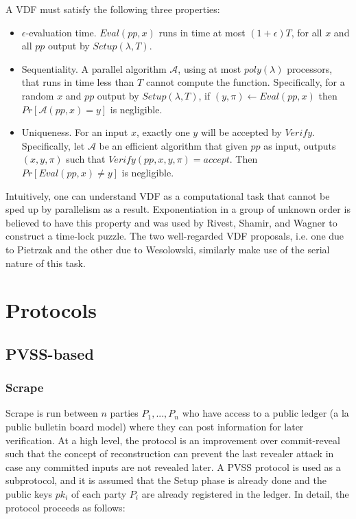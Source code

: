 \documentclass[11pt]{article}
\theoremstyle{definition}
\theoremstyle{remark}
\begin{document}
A VDF must satisfy the following three properties:
\begin{itemize}
\item $\epsilon$-evaluation time. $Eval(pp, x)$ runs in time at most $(1 + \epsilon) T$, for all $x$ and all $pp$ output by $Setup(\lambda, T)$.
\item Sequentiality. A parallel algorithm $\mathcal{A}$, using at most $poly(\lambda)$ processors, that runs in time less than $T$ cannot compute the function. Specifically, for a random $x$ and $pp$ output by $Setup(\lambda, T)$, if $(y, \pi) \leftarrow Eval(pp, x)$ then $Pr[\mathcal{A}(pp, x) = y]$ is negligible.
\item Uniqueness. For an input $x$, exactly one $y$ will be accepted by $Verify$. Specifically, let $\mathcal{A}$ be an efficient algorithm that given $pp$ as input, outputs $(x, y, \pi)$ such that $Verify(pp, x, y, \pi) = accept$. Then $Pr[Eval(pp, x) \neq y]$ is negligible.
\end{itemize}

Intuitively, one can understand VDF as a computational task that cannot be sped up by parallelism as a result. Exponentiation in a group of unknown order is believed to have this property and was used by Rivest, Shamir, and Wagner to construct a time-lock puzzle. The two well-regarded VDF proposals, i.e. one due to Pietrzak and the other due to Wesolowski, similarly make use of the serial nature of this task.

\section{Protocols}
\subsection{PVSS-based}
\subsubsection{Scrape}
Scrape is run between $n$ parties $P_1, ..., P_n$ who have access to a public ledger (a la public bulletin board model) where they can post information for later verification. At a high level, the protocol is an improvement over commit-reveal such that the concept of reconstruction can prevent the last revealer attack in case any committed inputs are not revealed later. A PVSS protocol is used as a subprotocol, and it is assumed that the Setup phase is already done and the public keys $pk_i$ of each party $P_i$ are already registered in the ledger. In detail, the protocol proceeds as follows:
\end{document}
